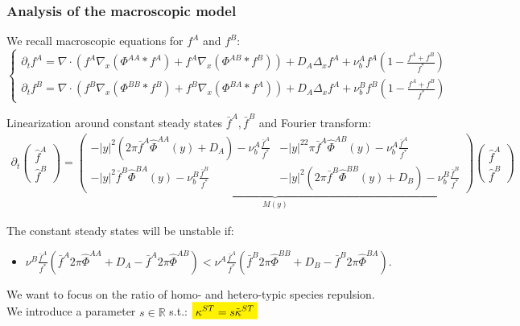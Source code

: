 \documentclass[10pt]{beamer}
\newcommand\ka{\kappa}
\def \p {{\partial}}
\def \bfA {{\bar{f}^A}}
\def \bfB {{\bar{f}^B}}
\def \hPAA {{\hat{\Phi}^{AA}}}
\def \hPBB {{\hat{\Phi}^{BB}}}
\def \hPAB {{\hat{\Phi}^{AB}}}
\def \hPBA {{\hat{\Phi}^{BA}}}
\theoremstyle{remark}
\newcommand\Fontvi{\fontsize{8}{7.2}\selectfont}
\newcommand{\highlight}[1]{%
	\colorbox{yellow}{$\displaystyle#1$}}
\begin{document}
\begin{frame}
\frametitle{Analysis of the macroscopic model}
\Fontvi
We recall macroscopic equations for $f^{A}$ and $f^{B}$:
	\begin{equation}
\begin{cases}
\p_t f^{A}=  \nabla \cdot (f^A\nabla_x(\Phi^{AA}* f^A) + f^A \nabla_x( \Phi^{AB}*f^B)) + D_A \Delta_x f^A + \nu_{b}^{A}f^A\left( 1-\frac{f^A+f^B}{f^{*}} \right) \\

\p_t f^{B}=  \nabla \cdot (f^B\nabla_x(\Phi^{BB}* f^B) + f^B \nabla_x (\Phi^{BA}*f^A)) + D_A \Delta_x f^A + \nu_{b}^{B}f^B\left( 1-\frac{f^A+f^B}{f^{*}} \right)
\end{cases}
\end{equation}

Linearization around constant steady states $\bfA, \bfB$ and Fourier transform:
\begin{align*}
\p_t \begin{pmatrix} \hat{f}^A \\ \hat{f}^B
\end{pmatrix}=
\underbrace{\begin{pmatrix} -|y|^2(2\pi\bfA\hPAA(y)+D_A)-\nu_{b}^A\frac{\bfA}{f^*} & -|y|^22\pi\bfA\hPAB(y)-\nu_{b}^A\frac{\bfA}{f^*} \\ 
-|y|^2\bfB\hPBA(y)-\nu_{b}^B\frac{\bfB}{f^*} & -|y|^2(2\pi\bfB\hPBB(y)+D_B)-\nu_{b}^B\frac{\bfB}{f^*} 
\end{pmatrix}}_{M(y)}
\begin{pmatrix} \hat{f}^A \\ \hat{f}^B
\end{pmatrix}
\end{align*}

The constant steady states will be unstable if:
\begin{itemize}
	\item $ \nu^{B}\frac{\bfA}{f^{*}}( \bfA 2\pi \hPAA+D_A - \bfA 2 \pi \hPAB )<
	\nu^{A} \frac{\bfA}{f^{*}}( \bfB 2 \pi \hPBB + D_B-\bfB 2\pi \hPBA ). $	
\end{itemize}
\vspace{0.3cm}
We want to focus on the ratio of homo- and hetero-typic species repulsion. \\
We introduce a parameter $s\in \mathbb{R}$ s.t.: $\highlight{\ka^{ST}=s\tilde{\ka}^{ST}}$ 





\end{frame}
\end{document}
